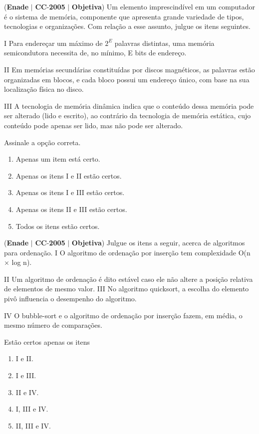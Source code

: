 \documentclass{exam}
\begin{document}
\begin{questions}
\question (\textbf{Enade} $|$ \textbf{CC}-\textbf{2005} $|$ \textbf{Objetiva})
Um elemento imprescindível em um computador é o sistema de
memória, componente que apresenta grande variedade de tipos,
tecnologias e organizações. Com relação a esse assunto, julgue
os itens seguintes.

I Para endereçar um máximo de $ 2^E $ palavras distintas, uma
memória semicondutora necessita de, no mínimo, E bits de
endereço.

II Em memórias secundárias constituídas por discos
magnéticos, as palavras estão organizadas em blocos, e cada
bloco possui um endereço único, com base na sua
localização física no disco.

III A tecnologia de memória dinâmica indica que o conteúdo
dessa memória pode ser alterado (lido e escrito), ao
contrário da tecnologia de memória estática, cujo conteúdo
pode apenas ser lido, mas não pode ser alterado.

Assinale a opção correta.
	\begin{enumerate}[label=\alph*)]
		\item  Apenas um item está certo.
		\item  Apenas os itens I e II estão certos.
		\item  Apenas os itens I e III estão certos.
		\item  Apenas os itens II e III estão certos.
		\item  Todos os itens estão certos.
	\end{enumerate}

\question (\textbf{Enade} $|$ \textbf{CC}-\textbf{2005} $|$ \textbf{Objetiva})
Julgue os itens a seguir, acerca de algoritmos para ordenação.
I O algoritmo de ordenação por inserção tem complexidade
O(n × log n).

II Um algoritmo de ordenação é dito estável caso ele não altere
a posição relativa de elementos de mesmo valor.
III No algoritmo quicksort, a escolha do elemento pivô
influencia o desempenho do algoritmo.

IV O bubble-sort e o algoritmo de ordenação por inserção
fazem, em média, o mesmo número de comparações.

Estão certos apenas os itens
	\begin{enumerate}[label=\alph*)]
		\item  I e II.
		\item  I e III.
		\item  II e IV.
		\item  I, III e IV.
		\item  II, III e IV.
	\end{enumerate}


\end{questions}
\end{document}
